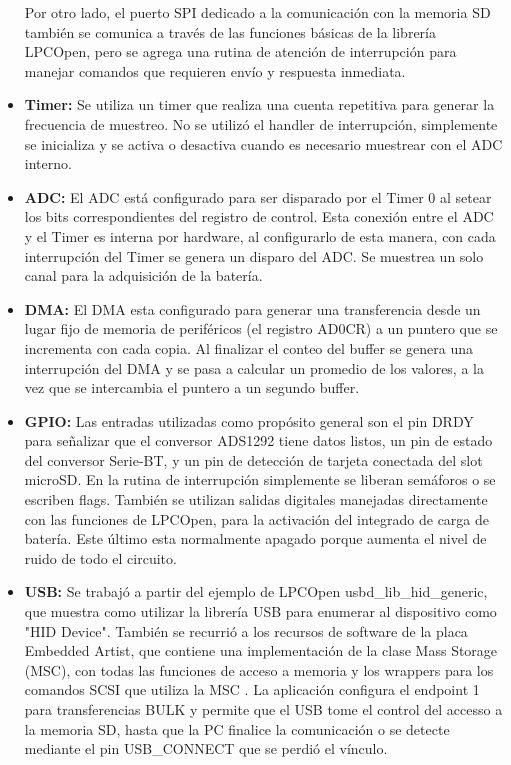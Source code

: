 \begin{itemize}
	Por otro lado, el puerto SPI dedicado a la comunicación con la memoria SD también se comunica a través de las funciones básicas de la librería LPCOpen, pero se agrega una rutina de atención de interrupción para manejar comandos que requieren envío y respuesta inmediata.

	\item \textbf{Timer:} Se utiliza un timer que realiza una cuenta repetitiva para generar la frecuencia de muestreo. No se utilizó el handler de interrupción, simplemente se inicializa y se activa o desactiva cuando es necesario muestrear con el ADC interno.

	\item \textbf{ADC:} El ADC está configurado para ser disparado por el Timer 0 al setear los bits correspondientes del registro de control. Esta conexión entre el ADC y el Timer es interna por hardware, al configurarlo de esta manera, con cada interrupción del Timer se genera un disparo del ADC. Se muestrea un solo canal para la adquisición de la batería.
	
	\item \textbf{DMA:} El DMA esta configurado para generar una transferencia desde un lugar fijo de memoria de periféricos (el registro AD0CR) a un puntero que se incrementa con cada copia. Al finalizar el conteo del buffer se genera una interrupción del DMA y se pasa a calcular un promedio de los valores, a la vez que se intercambia el puntero a un segundo buffer.
	
 	\item \textbf{GPIO:} Las entradas utilizadas como propósito general son el pin DRDY para señalizar que el conversor ADS1292 tiene datos listos, un pin de estado del conversor Serie-BT, y un pin de detección de tarjeta conectada del slot microSD. En la rutina de interrupción simplemente se liberan semáforos o se escriben flags. También se utilizan salidas digitales manejadas directamente con las funciones de LPCOpen, para la activación del integrado de carga de batería. Este último esta normalmente apagado porque aumenta el nivel de ruido de todo el circuito.

	\item \textbf{USB:} Se trabajó a partir del ejemplo de LPCOpen usbd\_lib\_hid\_generic, que muestra como utilizar la librería USB para enumerar al dispositivo como "HID Device". También se recurrió a los recursos de software de la placa Embedded Artist\citep{ea2013}, que contiene una implementación de la clase Mass Storage (MSC), con todas las funciones de acceso a memoria y los wrappers para los comandos SCSI que utiliza la MSC \citep{arm2019} \citep{peacock2002} \citep{axelson2006}. La aplicación configura el endpoint 1 para transferencias BULK y permite que el USB tome el control del accesso a la memoria SD, hasta que la PC finalice la comunicación o se detecte mediante el pin USB\_CONNECT que se perdió el vínculo.

\end{itemize}

